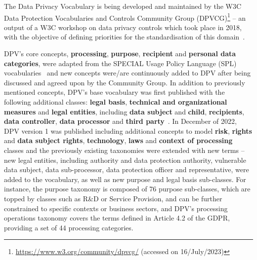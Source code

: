 The Data Privacy Vocabulary is being developed and maintained by the W3C Data Protection Vocabularies and Controls Community Group (DPVCG)\footnote{\url{https://www.w3.org/community/dpvcg/} (accessed on 16/July/2023)} -- an output of a W3C workshop on data privacy controls which took place in 2018, with the objective of defining priorities for the standardisation of this domain~\citep{bonatti_data_2018}.

DPV's core concepts, \textbf{processing}, \textbf{purpose}, \textbf{recipient} and \textbf{personal data categories}, were adapted from the SPECIAL Usage Policy Language (SPL) vocabularies~\citep{bonatti_policy_2018} and new concepts were/are continuously added to DPV after being discussed and agreed upon by the Community Group.
In addition to previously mentioned concepts, DPV's base vocabulary was first published with the following additional classes: \textbf{legal basis}, \textbf{technical and organizational measures} and \textbf{legal entities}, including \textbf{data subject} and \textbf{child}, \textbf{recipients}, \textbf{data controller}, \textbf{data processor} and \textbf{third party}~\citep{panetto_creating_2019}.
In December of 2022, DPV version 1 was published including additional concepts to model \textbf{risk}, \textbf{rights} and \textbf{data subject rights}, \textbf{technology}, \textbf{laws} and \textbf{context of processing} classes and the previously existing taxonomies were extended with new terms -- new legal entities, including authority and data protection authority, vulnerable data subject, data sub-processor, data protection officer and representative, were added to the vocabulary, as well as new purpose and legal basis sub-classes.
For instance, the purpose taxonomy is composed of 76 purpose sub-classes, which are topped by classes such as R\&D or Service Provision, and can be further constrained to specific contexts or business sectors, and DPV's processing operations taxonomy covers the terms defined in Article 4.2 of the GDPR, providing a set of 44 processing categories.


